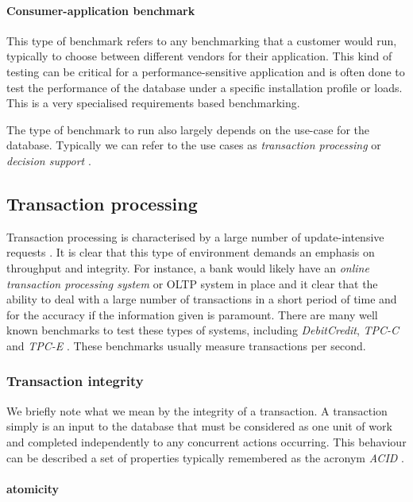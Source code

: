 \paragraph{Consumer-application benchmark} This type of benchmark refers to any
benchmarking that a customer would run, typically to choose between different
vendors for their application. This kind of testing can be critical for a
performance-sensitive application \cite{PractitionersIntroduction} and is often
done to test the performance of the database under a specific installation
profile \cite{DoingYourOwnBenchmark} or loads. This is a very specialised
requirements based benchmarking.


The type of benchmark to run also largely depends on the use-case for the
database. Typically we can refer to the use cases as \emph{transaction
processing} or \emph{decision support} \cite{PractitionersIntroduction}.

\subsection{Transaction processing}
Transaction processing is characterised by a large number of
update-intensive requests
\cite{PractitionersIntroduction}. It is clear that this type of environment
demands an emphasis on throughput and integrity. For instance, a bank would
likely have an \emph{online transaction processing system} or OLTP system in
place and it clear that the ability to deal with a large number of transactions
in a short period of time and for the accuracy if the information given is
paramount. There are many well known benchmarks to test these types of systems,
including \emph{DebitCredit}, \emph{TPC-C} and \emph{TPC-E} \cite{TPC-OLTP}.
These benchmarks usually measure transactions per second.

\subsubsection{Transaction integrity}
We briefly note what we mean by the integrity of a transaction. A transaction
simply is an input to the database that must be considered as one unit of work
\cite{ComputerScienceDictionary} and completed independently to any concurrent
actions occurring. This behaviour can be described a set of
properties typically remembered as the acronym \emph{ACID}
\cite{ComputerScienceDictionary, PractitionersIntroduction}.
\paragraph{atomicity}
